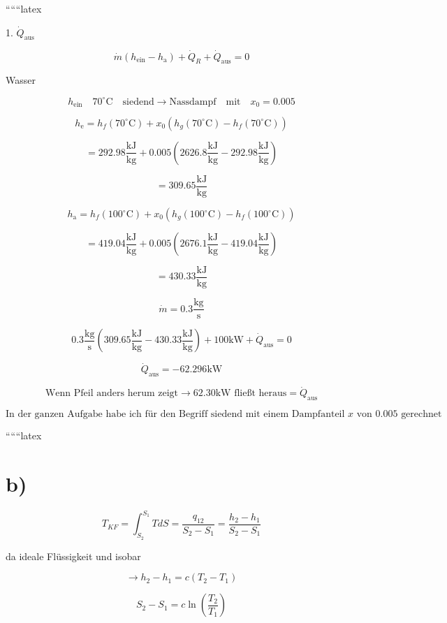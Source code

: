 
``````latex


1. \( \dot{Q}_{\text{aus}} \)

\[
\dot{m}(h_{\text{ein}} - h_{\text{a}}) + \dot{Q}_{R} + \dot{Q}_{\text{aus}} = 0
\]

Wasser

\[
h_{\text{ein}} \quad 70^\circ \text{C} \quad \text{siedend} \rightarrow \text{Nassdampf} \quad \text{mit} \quad x_0 = 0.005
\]

\[
h_{\text{e}} = h_f(70^\circ \text{C}) + x_0 (h_g(70^\circ \text{C}) - h_f(70^\circ \text{C}))
\]

\[
= 292.98 \frac{\text{kJ}}{\text{kg}} + 0.005 \left( 2626.8 \frac{\text{kJ}}{\text{kg}} - 292.98 \frac{\text{kJ}}{\text{kg}} \right)
\]

\[
= 309.65 \frac{\text{kJ}}{\text{kg}}
\]

\[
h_{\text{a}} = h_f(100^\circ \text{C}) + x_0 (h_g(100^\circ \text{C}) - h_f(100^\circ \text{C}))
\]

\[
= 419.04 \frac{\text{kJ}}{\text{kg}} + 0.005 \left( 2676.1 \frac{\text{kJ}}{\text{kg}} - 419.04 \frac{\text{kJ}}{\text{kg}} \right)
\]

\[
= 430.33 \frac{\text{kJ}}{\text{kg}}
\]

\[
\dot{m} = 0.3 \frac{\text{kg}}{\text{s}}
\]

\[
0.3 \frac{\text{kg}}{\text{s}} (309.65 \frac{\text{kJ}}{\text{kg}} - 430.33 \frac{\text{kJ}}{\text{kg}}) + 100 \text{kW} + \dot{Q}_{\text{aus}} = 0
\]

\[
\dot{Q}_{\text{aus}} = -62.296 \text{kW}
\]

\[
\text{Wenn Pfeil anders herum zeigt} \rightarrow 62.30 \text{kW} \text{ fließt heraus} = \dot{Q}_{\text{aus}}
\]

\[
\text{In der ganzen Aufgabe habe ich für den Begriff siedend mit einem Dampfanteil } x \text{ von } 0.005 \text{ gerechnet}
\]

``````latex


\section*{b)}

\[
T_{KF} = \int_{S_2}^{S_1} T dS = \frac{q_{12}}{S_2 - S_1} = \frac{h_2 - h_1}{S_2 - S_1}
\]

da ideale Flüssigkeit und isobar

\[
\rightarrow h_2 - h_1 = c (T_2 - T_1)
\]

\[
S_2 - S_1 = c \ln \left( \frac{T_2}{T_1} \right)
\]

